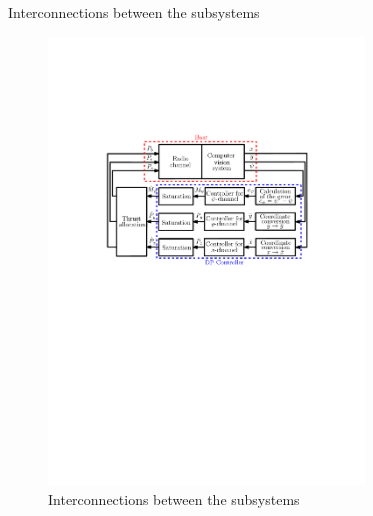 \documentclass[10pt,pdf,hyperref={unicode}]{beamer}
\begin{document}
\begin{frame}{Interconnections between the subsystems}

\begin{figure}[t]
	\centering
	\includegraphics[width=8.4cm]{scheme}
	\caption{Interconnections between the subsystems}
	\label{scheme}
\end{figure}

\end{frame}
\end{document}
